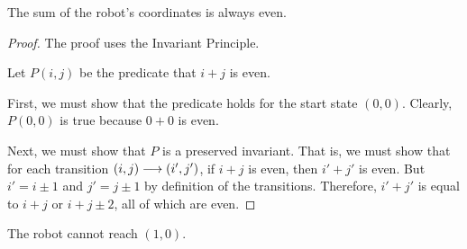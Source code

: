\begin{theorem}
The sum of the robot's coordinates is always even.
\end{theorem}

\begin{proof}
The proof uses the Invariant Principle.

Let $P(i, j)$ be the predicate that $i + j$ is even.

First, we must show that the predicate holds for the start state $(0,0)$.
Clearly, $P(0, 0)$ is true because $0 + 0$ is even.

Next, we must show that $P$ is a preserved invariant.  That is, we must
show that for each transition $(i, j) \mathrel{\longrightarrow} (i', j')$, if $i + j$ is
even, then $i' + j'$ is even.  But $i' = i \pm 1$ and $j' = j \pm 1$ by
definition of the transitions.  Therefore, $i' + j'$ is equal to $i + j$
or $i + j \pm 2$, all of which are even.
\end{proof}

\begin{corollary}
The robot cannot reach $(1, 0)$.
\end{corollary}

\begin{problems}
\classproblems


\homeworkproblems







\end{problems}

